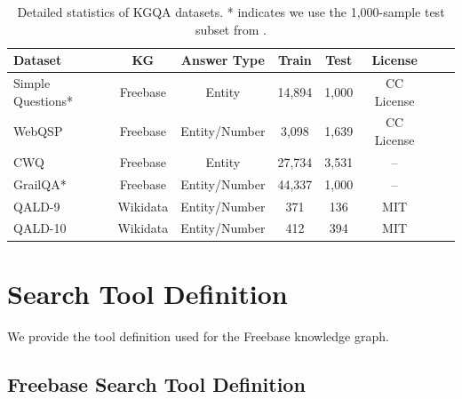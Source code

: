 \documentclass[sigconf]{acmart}
\begin{document}
\begin{table}[h]
\centering
\caption{Detailed statistics of KGQA datasets. * indicates we use the 1,000-sample test subset from \citet{sun2024thinkongraph}.}
\label{tab:dataset_stats}
\begin{tabular}{lccccccc}
\toprule
\textbf{Dataset} & \textbf{KG} & \textbf{Answer Type} & \textbf{Train} & \textbf{Test} & \textbf{License} \\
\midrule
Simple Questions* & Freebase & Entity & 14,894 & 1,000 & CC License \\
WebQSP & Freebase & Entity/Number & 3,098 & 1,639 & CC License \\
CWQ & Freebase & Entity & 27,734 & 3,531 & -- \\
GrailQA* & Freebase & Entity/Number & 44,337 & 1,000 & -- \\
QALD-9 & Wikidata & Entity/Number & 371 & 136 & MIT \\
QALD-10 & Wikidata & Entity/Number & 412 & 394 & MIT \\
\bottomrule
\end{tabular}
\end{table}

\raggedbottom
\section{Search Tool Definition}
\label{app:tool_defs}

We provide the tool definition used for the Freebase knowledge graph.

\subsection{Freebase Search Tool Definition}
\label{app:freebase_tool_defs}
\end{document}
